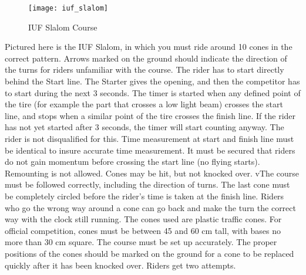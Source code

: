 \begin{figure}[h]
\begin{center}
\texttt{[image: iuf\_slalom]}
\end{center}
\vspace{-20pt}
\caption{IUF Slalom Course \label{fig:iuf_slalom}}
\vspace{-10pt}
\end{figure}
Pictured here is the IUF Slalom, in which you must ride around 10 cones in the correct pattern.
Arrows marked on the ground should indicate the direction of the turns for riders unfamiliar with the course.
The rider has to start directly behind the Start line.
The Starter gives the opening, and then the competitor has to start during the next 3 seconds.
The timer is started when any defined point of the tire (for example the part that crosses a low light beam) crosses the start line, and stops when a similar point of the tire crosses the finish line.
If the rider has not yet started after 3 seconds, the timer will start counting anyway.
The rider is not disqualified for this.
Time measurement at start and finish line must be identical to insure accurate time measurement.
It must be secured that riders do not gain momentum before crossing the start line (no flying starts).
Remounting is not allowed. 
Cones may be hit, but not knocked over.
vThe course must be followed correctly, including the direction of turns.
The last cone must be completely circled before the rider's time is taken at the finish line.
Riders who go the wrong way around a cone can go back and make the turn the correct way with the clock still running.
The cones used are plastic traffic cones.
For official competition, cones must be between 45 and 60 cm tall, with bases no more than 30 cm square.
The course must be set up accurately.
The proper positions of the cones should be marked on the ground for a cone to be replaced quickly after it has been knocked over.
Riders get two attempts.
